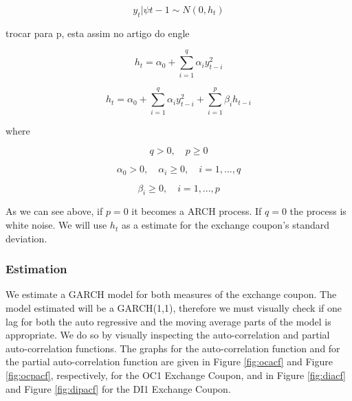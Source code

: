 \documentclass[cic,tc, english]{iiufrgs}
\begin{document}
    \begin{equation}
        \label{eqn:archgarch}
        y_t | \psi{t-1} \sim N(0,h_t)
    \end{equation}

    {trocar para p, esta assim no artigo do engle}

    \begin{equation}
        \label{eqn:arch}
        h_t = \alpha_0 + \displaystyle\sum_{i=1}^{q} \alpha_i y_{t-i}^2
    \end{equation}

    \begin{equation}
        \label{eqn:garch}
        h_t = \alpha_0 + \displaystyle\sum_{i=1}^{q} \alpha_i y_{t-i}^2 + \displaystyle\sum_{i=1}^{p} \beta_i h_{t-i}
    \end{equation}

    where

    $$q > 0, \quad   p \geq 0$$

    $$\alpha_0 > 0, \quad  \alpha_i \geq 0, \quad  i=1,...,q$$

    $$\beta_i \geq 0, \quad  i=1,...,p$$

    As we can see above, if $p = 0$ it becomes a ARCH process. If $q = 0$ the process is white noise. We will use $h_t$ as a estimate for the exchange coupon's standard deviation.

\subsubsection{Estimation} \label{chapter_estimation}

    We estimate a GARCH model for both measures of the exchange coupon. The model estimated will be a GARCH(1,1), therefore we must visually check if one lag for both the auto regressive and the moving average parts of the model is appropriate. We do so by visually inspecting the auto-correlation and partial auto-correlation functions. The graphs for the auto-correlation function and for the partial auto-correlation function are given in Figure \ref{fig:ocacf} and Figure \ref{fig:ocpacf}, respectively, for the OC1 Exchange Coupon, and in Figure \ref{fig:diacf} and Figure \ref{fig:dipacf} for the DI1 Exchange Coupon.

    

    

    

    
\end{document}
